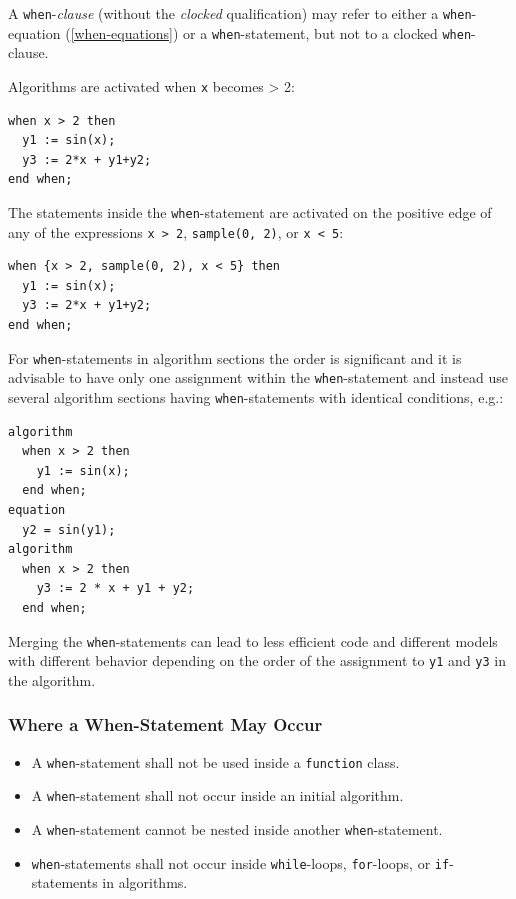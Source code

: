 A \lstinline!when!-\emph{clause} (without the \emph{clocked} qualification) may refer to either a \lstinline!when!-equation (\cref{when-equations}) or a \lstinline!when!-statement, but not to a clocked \lstinline!when!-clause.

\begin{example}
Algorithms are activated when \lstinline!x! becomes \textgreater{} 2:
\begin{lstlisting}[language=modelica]
when x > 2 then
  y1 := sin(x);
  y3 := 2*x + y1+y2;
end when;
\end{lstlisting}
The statements inside the \lstinline!when!-statement are activated on the positive edge of any of the expressions \lstinline!x > 2!, \lstinline!sample(0, 2)!, or \lstinline!x < 5!:
\begin{lstlisting}[language=modelica]
when {x > 2, sample(0, 2), x < 5} then
  y1 := sin(x);
  y3 := 2*x + y1+y2;
end when;
\end{lstlisting}
For \lstinline!when!-statements in algorithm sections the order is significant and it is advisable to have only one assignment within the \lstinline!when!-statement and instead use several algorithm sections having \lstinline!when!-statements with identical conditions, e.g.:
\begin{lstlisting}[language=modelica]
algorithm
  when x > 2 then
    y1 := sin(x);
  end when;
equation
  y2 = sin(y1);
algorithm
  when x > 2 then
    y3 := 2 * x + y1 + y2;
  end when;
\end{lstlisting}
Merging the \lstinline!when!-statements can lead to less efficient code and different models with different behavior depending on the order of the assignment to \lstinline!y1! and \lstinline!y3! in the algorithm.
\end{example}

\subsubsection{Where a When-Statement May Occur}\label{restrictions-on-where-a-when-statement-may-occur}\label{where-a-when-statement-may-occur}

\begin{itemize}
\item
  A \lstinline!when!-statement shall not be used inside a \lstinline!function! class.
\item
  A \lstinline!when!-statement shall not occur inside an initial algorithm.
\item
  A \lstinline!when!-statement cannot be nested inside another \lstinline!when!-statement.
\item
  \lstinline!when!-statements shall not occur inside \lstinline!while!-loops, \lstinline!for!-loops, or \lstinline!if!-statements in algorithms.
\end{itemize}

